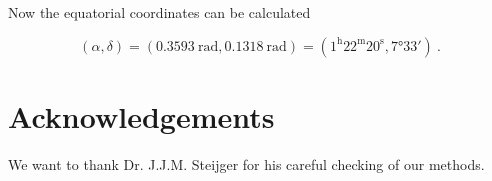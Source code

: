 Now the equatorial coordinates can be calculated

\begin{equation}
    (\alpha, \delta) = (\SI{0.3593}{\radian}, \SI{0.1318}{\radian}) = 
        (1^\mathrm{h}22^\mathrm{m}20^\mathrm{s}, \ang{7;33;}) \ .
\end{equation}


\section{Acknowledgements}

We want to thank Dr. J.J.M. Steijger for his careful checking of our
methods.

